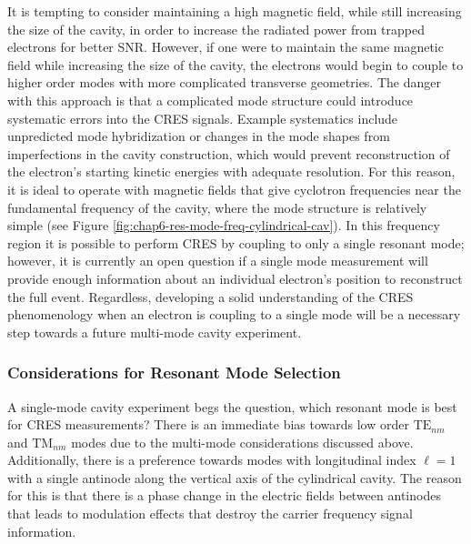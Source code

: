 It is tempting to consider maintaining a high magnetic field, while still increasing the size of the cavity, in order to increase the radiated power from trapped electrons for better SNR. However, if one were to maintain the same magnetic field while increasing the size of the cavity, the electrons would begin to couple to higher order modes with more complicated transverse geometries. The danger with this approach is that a complicated mode structure could introduce systematic errors into the CRES signals. Example systematics include unpredicted mode hybridization or changes in the mode shapes from imperfections in the cavity construction, which would prevent reconstruction of the electron's starting kinetic energies with adequate resolution. For this reason, it is ideal to operate with magnetic fields that give cyclotron frequencies near the fundamental frequency of the cavity, where the mode structure is relatively simple (see Figure \ref{fig:chap6-res-mode-freq-cylindrical-cav}). In this frequency region it is possible to perform CRES by coupling to only a single resonant mode; however, it is currently an open question if a single mode measurement will provide enough information about an individual electron's position to reconstruct the full event. Regardless, developing a solid understanding of the CRES phenomenology when an electron is coupling to a single mode will be a necessary step towards a future multi-mode cavity experiment.

\subsubsection*{Considerations for Resonant Mode Selection}

A single-mode cavity experiment begs the question, which resonant mode is best for CRES measurements? There is an immediate bias towards low order $\mathrm{TE}_{nm}$ and $\mathrm{TM}_{nm}$ modes due to the multi-mode considerations discussed above. Additionally, there is a preference towards modes with longitudinal index $\ell=1$ with a single antinode along the vertical axis of the cylindrical cavity. The reason for this is that there is a phase change in the electric fields between antinodes that leads to modulation effects that destroy the carrier frequency signal information. 

